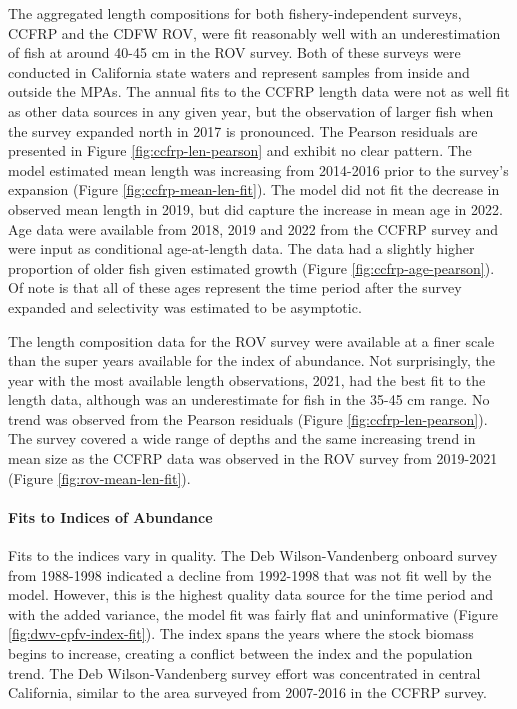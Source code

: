 \documentclass[11pt,
  english,
  letterpaper,
]{article}
\begin{document}
The aggregated length compositions for both fishery-independent surveys, CCFRP and the CDFW ROV, were fit reasonably well with an underestimation of fish at around 40-45 cm in the ROV survey. Both of these surveys were conducted in California state waters and represent samples from inside and outside the MPAs. The annual fits to the CCFRP length data were not as well fit as other data sources in any given year, but the observation of larger fish when the survey expanded north in 2017 is pronounced. The Pearson residuals are presented in Figure \ref{fig:ccfrp-len-pearson} and exhibit no clear pattern. The model estimated mean length was increasing from 2014-2016 prior to the survey's expansion (Figure \ref{fig:ccfrp-mean-len-fit}). The model did not fit the decrease in observed mean length in 2019, but did capture the increase in mean age in 2022. Age data were available from 2018, 2019 and 2022 from the CCFRP survey and were input as conditional age-at-length data. The data had a slightly higher proportion of older fish given estimated growth (Figure \ref{fig:ccfrp-age-pearson}). Of note is that all of these ages represent the time period after the survey expanded and selectivity was estimated to be asymptotic.

The length composition data for the ROV survey were available at a finer scale than the super years available for the index of abundance. Not surprisingly, the year with the most available length observations, 2021, had the best fit to the length data, although was an underestimate for fish in the 35-45 cm range. No trend was observed from the Pearson residuals (Figure \ref{fig:ccfrp-len-pearson}). The survey covered a wide range of depths and the same increasing trend in mean size as the CCFRP data was observed in the ROV survey from 2019-2021 (Figure \ref{fig:rov-mean-len-fit}).

\hypertarget{fits-to-indices-of-abundance}{%
\paragraph{Fits to Indices of Abundance}\label{fits-to-indices-of-abundance}}

\hfill\break

Fits to the indices vary in quality. The Deb Wilson-Vandenberg onboard survey from 1988-1998 indicated a decline from 1992-1998 that was not fit well by the model. However, this is the highest quality data source for the time period and with the added variance, the model fit was fairly flat and uninformative (Figure \ref{fig:dwv-cpfv-index-fit}). The index spans the years where the stock biomass begins to increase, creating a conflict between the index and the population trend. The Deb Wilson-Vandenberg survey effort was concentrated in central California, similar to the area surveyed from 2007-2016 in the CCFRP survey.
\end{document}
